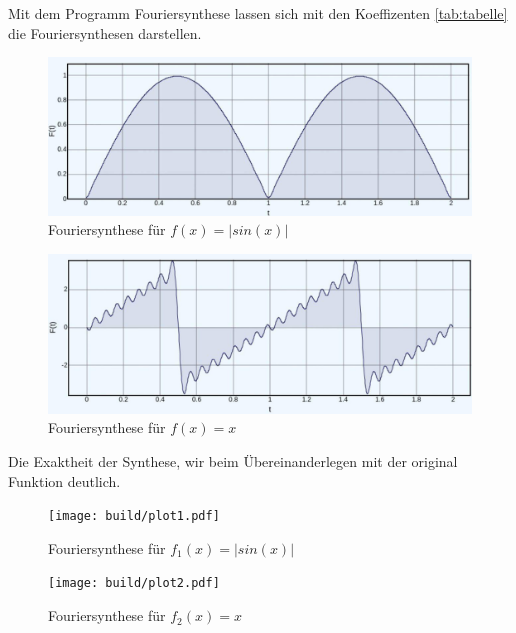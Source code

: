 Mit dem Programm Fouriersynthese \cite{Fouriersynthese} lassen sich mit den Koeffizenten \ref{tab:tabelle} die Fouriersynthesen darstellen.

\begin{figure}
    \centering
    \includegraphics[width=\textwidth]{website/sin.jpg}
    \caption{Fouriersynthese für $f(x)=|sin(x)|$}
\end{figure}


\begin{figure}
    \centering
    \includegraphics[width=\textwidth]{website/x.jpg}
    \caption{Fouriersynthese für $f(x)=x$}
    \label{fig:x_website}
\end{figure}

\newpage

Die Exaktheit der Synthese, wir beim Übereinanderlegen mit der original Funktion deutlich.
\begin{figure}
    \centering
    \texttt{[image: build/plot1.pdf]}
    \caption{Fouriersynthese für $f_1(x)=|sin(x)|$}
    \label{fig:FS_sin}
\end{figure}

\begin{figure}
    \centering
    \texttt{[image: build/plot2.pdf]}
    \caption{Fouriersynthese für $f_2(x)=x$}
    \label{fig:FS_x}
\end{figure}
